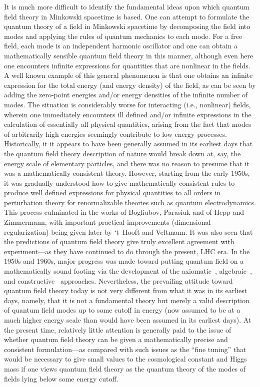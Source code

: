 \documentclass[12pt]{article}
\theoremstyle{plain}
\theoremstyle{definition}
\begin{document}
It is much more difficult to identify the fundamental ideas upon which quantum field theory in Minkowski spacetime is based. One can attempt to formulate the quantum theory of a field in Minkowski spacetime by decomposing the field into modes and applying the rules of quantum mechanics to each mode. For a free field, each mode is an independent harmonic oscillator and one can obtain a mathematically sensible quantum field theory in this manner, although even here one encounters infinite expressions for quantities that are nonlinear in the fields. A well known example of this general phenomenon is that one obtains an infinite expression for the total energy (and energy density) of the field, as can be seen by adding the zero-point energies and/or energy densities of the infinite number of modes. The situation is considerably worse for interacting (i.e., nonlinear) fields, wherein one immediately encounters ill defined and/or infinite expressions in the calculation of essentially all physical quantities, arising from the fact that modes of arbitrarily high energies seemingly contribute to low energy processes. Historically, it it appears to have been generally assumed in its earliest days that the quantum field theory description of nature would break down at, say, the energy scale of elementary particles, and there was no reason to presume that it was a mathematically consistent theory. However, starting from the early 1950s, it was gradually understood how to give mathematically consistent rules to produce well defined expressions for physical quantities to all orders in perturbation theory for renormalizable theories such as quantum electrodynamics. This process culminated in the works of Bogliubov, Parasiuk
and of Hepp and Zimmermann, with important practical improvements (dimensional regularization) being given later by `t~Hooft and Veltmann. It was also seen that the predictions of quantum field theory give truly excellent agreement with experiment---as they have continued to do through the present, LHC era. In the 1950s and 1960s, major progress was made toward putting quantum field on a mathematically sound footing via the development of the axiomatic~\cite{sw}, algebraic~\cite{haag}, and constructive~\cite{glimm} approaches. Nevertheless, the prevailing attitude toward quantum field theory today is not very different from what it was in its earliest days, namely, that it is not a fundamental theory but merely a valid description of quantum field modes up to some cutoff in energy (now assumed to be at a much higher energy scale than would have been assumed in its earliest days). At the present time, relatively little attention is generally paid to the issue of whether quantum field theory can be given a mathematically precise and consistent formulation---as compared with such issues as the ``fine tuning'' that would be necessary to give small values to the cosmological constant and Higgs mass if one views quantum field theory as the quantum theory of the modes of fields lying below some energy cutoff.
\end{document}

